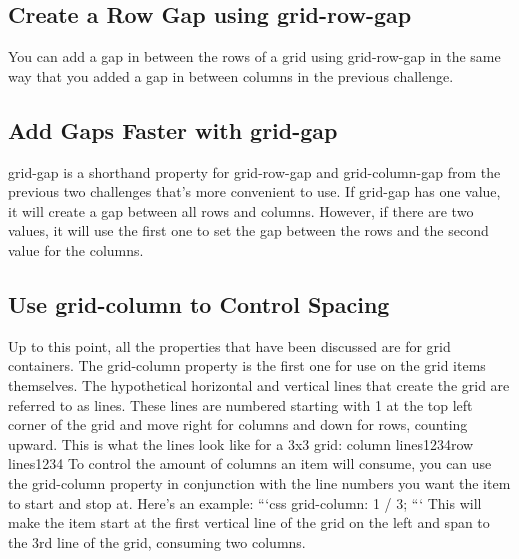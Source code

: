 \documentclass{article}%
\begin{document}
%
\subsection{Create a Row Gap using grid{-}row{-}gap}%
\label{subsec:CreateaRowGapusinggrid{-}row{-}gap}%
You can add a gap in between the rows of a grid using grid{-}row{-}gap in the same way that you added a gap in between columns in the previous challenge.\newline%

%
\subsection{Add Gaps Faster with grid{-}gap}%
\label{subsec:AddGapsFasterwithgrid{-}gap}%
grid{-}gap is a shorthand property for grid{-}row{-}gap and grid{-}column{-}gap from the previous two challenges that's more convenient to use. If grid{-}gap has one value, it will create a gap between all rows and columns. However, if there are two values, it will use the first one to set the gap between the rows and the second value for the columns.\newline%

%
\subsection{Use grid{-}column to Control Spacing}%
\label{subsec:Usegrid{-}columntoControlSpacing}%
Up to this point, all the properties that have been discussed are for grid containers. The grid{-}column property is the first one for use on the grid items themselves.\newline%
The hypothetical horizontal and vertical lines that create the grid are referred to as lines. These lines are numbered starting with 1 at the top left corner of the grid and move right for columns and down for rows, counting upward.\newline%
This is what the lines look like for  a 3x3 grid:\newline%
column lines1234row lines1234\newline%
To control the amount of columns an item will consume, you can use the grid{-}column property in conjunction with the line numbers you want the item to start and stop at.\newline%
Here's an example:\newline%
```css\newline%
grid{-}column: 1 / 3;\newline%
```\newline%
This will make the item start at the first vertical line of the grid on the left and span to the 3rd line of the grid, consuming two columns.\newline%
\end{document}

